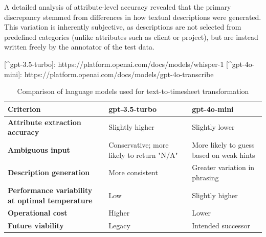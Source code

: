 \documentclass[
  digital,     %
  oneside,     %
  nosansbold,  %
  nocolorbold, %
  lof,         %
  lot,         %
]{fithesis4}
\begin{document}
\begin{markdown}
A detailed analysis of attribute-level accuracy revealed that the primary discrepancy stemmed from differences in how textual descriptions were generated. This variation is inherently subjective, as descriptions are not selected from predefined categories (unlike attributes such as client or project), but are instead written freely by the annotator of the test data.

[^gpt-3.5-turbo]: https://platform.openai.com/docs/models/whisper-1
[^gpt-4o-mini]: https://platform.openai.com/docs/models/gpt-4o-transcribe

\end{markdown}
\shorthandon{-}

\begin{table}[H]
\centering
\begin{tabularx}{\textwidth}{|X|X|X|}
\hline
\textbf{Criterion} & \textbf{gpt-3.5-turbo} & \textbf{gpt-4o-mini} \\
\hline
\textbf{Attribute extraction accuracy} & Slightly higher & Slightly lower \\
\hline
\textbf{Ambiguous input} & Conservative; more likely to return "N/A" & More likely to guess based on weak hints \\
\hline
\textbf{Description generation} & More consistent & Greater variation in phrasing \\
\hline
\textbf{Performance variability at optimal temperature} & Low & Slightly higher \\
\hline
\textbf{Operational cost} & Higher & Lower \\
\hline
\textbf{Future viability} & Legacy & Intended successor \\
\hline
\end{tabularx}
\caption{Comparison of language models used for text-to-timesheet transformation}
\label{tab:text_to_timesheet_models}
\end{table}
\end{document}
